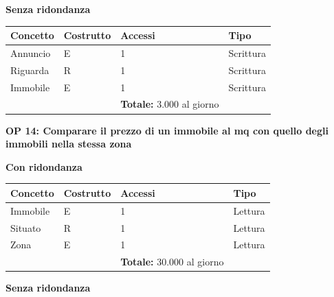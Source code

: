 \documentclass[a4paper,12pt]{report}
\begin{document}
            \begin{center}
                \textbf{Senza ridondanza}
            \end{center}
            \begin{table}[H]
            \centering
            \begin{tabular}{llll}
            \rowcolor{green!20} \textbf{Concetto} & \textbf{Costrutto} & \textbf{Accessi} & \textbf{Tipo} \\ [0.5ex] 
            \hline
            Annuncio & E & 1 & Scrittura \\ 
            Riguarda & R & 1 & Scrittura \\ 
            Immobile & E & 1 & Scrittura \\ 
            \hline
            \rowcolor{green!20}  &   & \textbf{Totale:}  3.000 al giorno &  \\ [1ex] 
            \end{tabular}
            \end{table}
            \newpage
        	\noindent
            \textbf{OP 14: Comparare il prezzo di un immobile al mq con quello degli immobili nella stessa zona}
        	\begin{center}
                \textbf{Con ridondanza}
            \end{center}
            \begin{table}[H]
            \centering
             \begin{tabular}{llll}
             \rowcolor{yellow!20} \textbf{Concetto} & \textbf{Costrutto} & \textbf{Accessi} & \textbf{Tipo}\\ [0.5ex] 
             \hline
             Immobile & E & 1 & Lettura \\ 
             Situato & R & 1 & Lettura \\ 
             Zona & E & 1 & Lettura \\ 
             \hline
                \rowcolor{yellow!20} &   & \textbf{Totale:}  30.000 al giorno &  \\ [1ex] 
             
             \end{tabular}
            \end{table}
        	\begin{center}
                \textbf{Senza ridondanza}
            \end{center}
\end{document}
